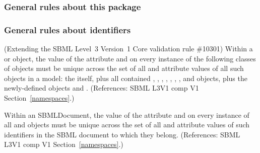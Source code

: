 \subsubsection*{General rules about this package}  \subsubsection*{General rules about identifiers} \begin{sbmlenum}

 {  (Extending the SBML Level~3 Version~1 Core
  validation rule \#10301) Within a \Model or \ExternalModelDefinition
  object, the value of the attribute  and  on
  every instance of the following classes of objects must be unique
  across the set of all  and  attribute values
  of all such objects in a model: the \Model itself, plus all contained
  \FunctionDefinition, \Compartment, \Species, \Reaction,
  \SpeciesReference, \ModifierSpeciesReference, \Event, and \Parameter
  objects, plus the newly-defined objects \Submodel and \Deletion.
  (References: SBML L3V1 comp V1 Section~\ref{namespaces}.) }


 {  Within an SBMLDocument, the value of the
  attribute  and  on every instance of all
  \Model and \ExternalModelDefinition objects must
  be unique across the set of all  and 
  attribute values of such identifiers in the SBML document to which
  they belong.
  (References: SBML L3V1 comp V1 Section~\ref{namespaces}.) }



\end{sbmlenum}
